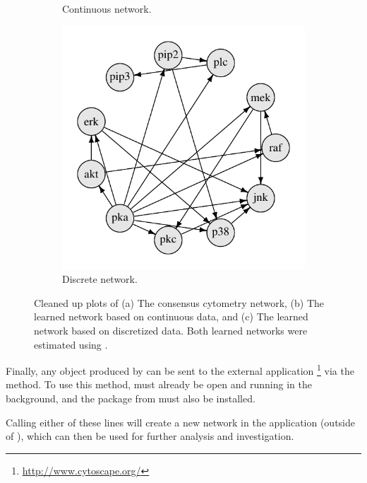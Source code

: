 \documentclass[article]{jss}
\renewcommand{\|}{\,|\,}
\begin{document}
\begin{figure}[t!]
\begin{subfigure}[b]{0.32\textwidth}
\caption{Continuous network.}
\label{fig:cytoresults:cts}
\end{subfigure}
\begin{subfigure}[b]{0.32\textwidth}
\includegraphics[width=\textwidth]{cyto-disc.pdf}
\caption{Discrete network.}
\label{fig:cytoresults:disc}
\end{subfigure}
\caption{Cleaned up plots of (a) The consensus cytometry network, (b) The learned network based on continuous data, and (c) The learned network based on discretized data. Both learned networks were estimated using .}
\label{fig:cytoresults}
\end{figure}

Finally, any object produced by  can be sent to the external application \footnote{\url{http://www.cytoscape.org/}} via the  method. To use this method,  must already be open and running in the background, and the  package from  must also be installed.
%
\begin{CodeChunk}
\end{CodeChunk}
%
Calling either of these lines will create a new network in the  application (outside of ), which can then be used for further analysis and investigation.
\end{document}
